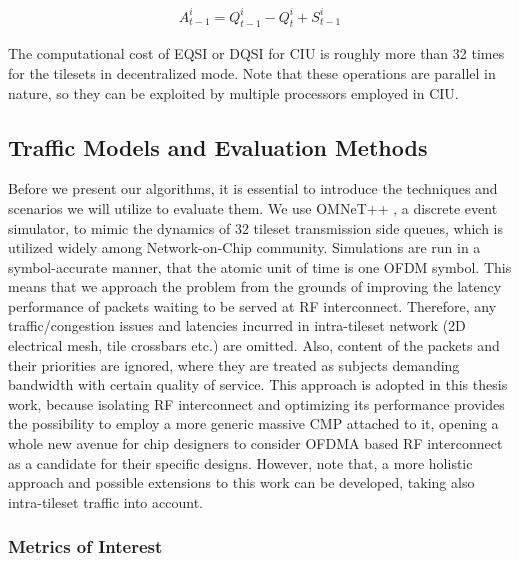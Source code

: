\begin{align}
A_{t-1}^{i} = Q_{t-1}^{i}  - Q_{t}^{i}  + S_{t-1}^{i} 
\end{align} 


The computational cost of EQSI or DQSI for CIU is roughly more than 32 times for the tilesets in decentralized mode. Note that these operations are parallel in nature, so they can be exploited by multiple processors employed in CIU.  




\subsection{Traffic Models and Evaluation Methods}

Before we present our algorithms, it is essential to introduce the techniques and scenarios we will utilize to evaluate them. We use OMNeT++ \cite{varga2001omnet++}, a discrete event simulator, to mimic the dynamics of 32 tileset transmission side queues, which is utilized widely among Network-on-Chip community. Simulations are run in a symbol-accurate manner, that the atomic unit of time is one OFDM symbol. This means that we approach the problem from the grounds of improving the latency performance of packets waiting to be served at RF interconnect. Therefore, any traffic/congestion issues and latencies incurred in intra-tileset network (2D electrical mesh, tile crossbars etc.) are omitted. Also, content of the packets and their priorities are ignored, where they are treated as subjects demanding bandwidth with certain quality of service. This approach is adopted in this thesis work, because isolating RF interconnect and optimizing its performance provides the possibility to employ a more generic massive CMP attached to it, opening a whole new avenue for chip designers to consider OFDMA based RF interconnect as a candidate for their specific designs. However, note that, a more holistic approach and possible extensions to this work can be developed, taking also intra-tileset traffic into account.   




\subsubsection{Metrics of Interest}

